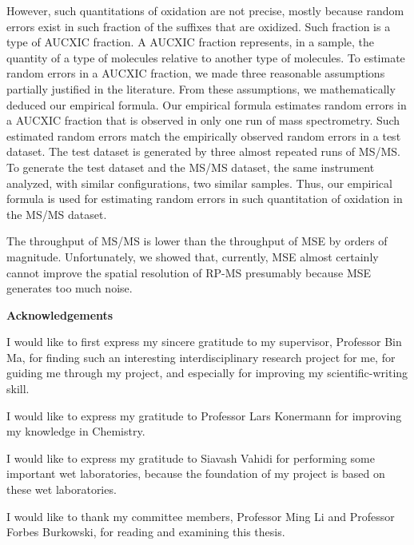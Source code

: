 {%
However, such quantitations of oxidation are not precise, mostly because random errors exist in such fraction of the suffixes that are oxidized.
Such fraction is a type of \gls{AUCXIC} fraction.
A \gls{AUCXIC} fraction represents, in a sample, the quantity of a type of molecules relative to another type of molecules.
To estimate random errors in a \gls{AUCXIC} fraction, we made three reasonable assumptions partially justified in the literature.
From these assumptions, we mathematically deduced our empirical formula.
Our empirical formula estimates random errors in a \gls{AUCXIC} fraction that is observed in only one run of mass spectrometry.
Such estimated random errors match the empirically observed random errors in a test dataset.
The test dataset is generated by three almost repeated runs of \gls{MS/MS}.
To generate the test dataset and the \gls{MS/MS} dataset, the same instrument analyzed, with similar configurations, two similar samples.
Thus, our empirical formula is used for estimating random errors in such quantitation of oxidation in the \gls{MS/MS} dataset.

The throughput of \gls{MS/MS} is lower than the throughput of \gls{MSE} by orders of magnitude.
Unfortunately, we showed that, currently, \gls{MSE} almost certainly cannot improve the spatial resolution of \gls{RP-MS}
	presumably because \gls{MSE} generates too much noise.
		
\cleardoublepage
\begin{center}\textbf{Acknowledgements}\end{center}
I would like to first express my sincere gratitude to my supervisor, 
	Professor Bin Ma, 
	for finding such an interesting interdisciplinary research project for me,
	for guiding me through my project, 
	and especially for improving my scientific-writing skill.
	
I would like to express my gratitude to
		Professor Lars Konermann 
		for improving my knowledge in Chemistry.

I would like to express my gratitude to
		Siavash Vahidi 
		for performing some important wet laboratories,
	because the foundation of my project is based on these wet laboratories. 

I would like to thank my committee members, 
		Professor Ming Li and Professor Forbes Burkowski, 
		for reading and examining this thesis.

}

